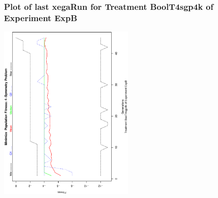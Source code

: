  \begin{frame}
 \frametitle{ Plot of last xegaRun for Treatment BoolT4sgp4k of Experiment ExpB }
 \begin{center}
\includegraphics[width=0.5\textwidth, angle=-90]
{ExpBPlotPopStatsFigure022.eps}
 \end{center}
 \label{report/ExpBPlotPopStatsFigure022.eps}  
 \end{frame}

